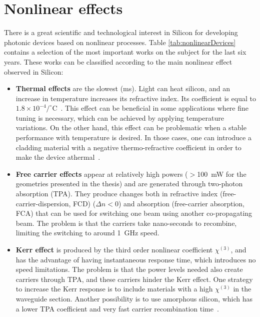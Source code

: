 \pagestyle{fancy}
\lhead{}
\renewcommand{\chaptermark}[1]{\markboth{\thechapter.\ #1}{}}

\chapter{Nonlinear effects}
\label{ch:nonlinearEffects}

There is a great scientific and technological interest in Silicon for developing photonic devices based on nonlinear processes. Table \ref{tab:nonlinearDevices} contains a selection of the most important works on the subject for the last six years.
These works can be classified according to the main nonlinear effect observed in Silicon:

\begin{itemize}
\item \textbf{Thermal effects} are the slowest (ms).
Light can heat silicon, and an increase in temperature increases its refractive index. Its coefficient is equal to $1.8 \times 10^{-4}/^\circ$C~\cite{Pruessner2007,Kiyat2006}. This effect can be beneficial in some applications where fine tuning is necessary, which can be achieved by applying temperature variations. On the other hand, this effect can be problematic when a stable performance with temperature is desired. In those cases, one can introduce a cladding material with a negative thermo-refractive coefficient in order to make the device athermal~\cite{Teng2009,Zhou2009a,Han2007}.

\item \textbf{Free carrier effects} \cite{Almeida2004,Boyraz2004,Preble2005,Liang:05,Foster2007,Waldow2008} appear at relatively high powers ($>$100~mW for the geometries presented in the thesis) and are generated through two-photon absorption (TPA). They produce changes both in refractive index (free-carrier-dispersion, FCD) ($\Delta n < 0$) and absorption (free-carrier absorption, FCA) that can be used for switching one beam using another co-propagating beam. The problem is that the carriers take nano-seconds to recombine, limiting the switching to around 1~GHz speed.


\item \textbf{Kerr effect} \cite{Hochberg2006,Martinez2010} is produced by the third order nonlinear coefficient $\chi^{(3)}$, and has the advantage of having instantaneous response time, which introduces no speed limitations.
The problem is that the power levels needed also create carriers through TPA, and these carriers hinder the Kerr effect.
One strategy to increase the Kerr response is to include materials with a high $\chi^{(3)}$ in the waveguide section. Another possibility is to use amorphous silicon, which has a lower TPA coefficient and very fast carrier recombination time~\cite{Matres2013}.


\end{itemize}
